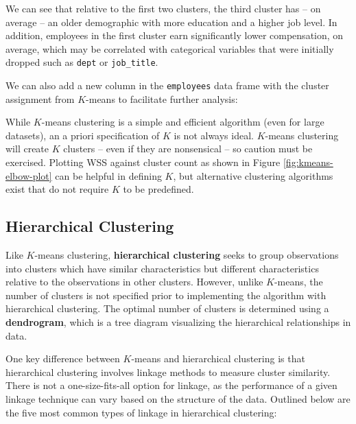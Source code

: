 \documentclass[
]{book}
\newenvironment{Shaded}{\begin{snugshade}}{\end{snugshade}}
\newcommand{\AttributeTok}[1]{\textcolor[rgb]{0.77,0.63,0.00}{#1}}
\newcommand{\CommentTok}[1]{\textcolor[rgb]{0.56,0.35,0.01}{\textit{#1}}}
\newcommand{\FunctionTok}[1]{\textcolor[rgb]{0.00,0.00,0.00}{#1}}
\newcommand{\NormalTok}[1]{#1}
\newcommand{\OtherTok}[1]{\textcolor[rgb]{0.56,0.35,0.01}{#1}}
\newcommand{\SpecialCharTok}[1]{\textcolor[rgb]{0.00,0.00,0.00}{#1}}
\begin{document}
We can see that relative to the first two clusters, the third cluster has -- on average -- an older demographic with more education and a higher job level. In addition, employees in the first cluster earn significantly lower compensation, on average, which may be correlated with categorical variables that were initially dropped such as \texttt{dept} or \texttt{job\_title}.

We can also add a new column in the \texttt{employees} data frame with the cluster assignment from \(K\)-means to facilitate further analysis:

\begin{Shaded}
\end{Shaded}

While \(K\)-means clustering is a simple and efficient algorithm (even for large datasets), an a priori specification of \(K\) is not always ideal. \(K\)-means clustering will create \(K\) clusters -- even if they are nonsensical -- so caution must be exercised. Plotting WSS against cluster count as shown in Figure \ref{fig:kmeans-elbow-plot} can be helpful in defining \(K\), but alternative clustering algorithms exist that do not require \(K\) to be predefined.

\hypertarget{hierarchical-clustering}{%
\subsection{Hierarchical Clustering}\label{hierarchical-clustering}}

Like \(K\)-means clustering, \textbf{hierarchical clustering} seeks to group observations into clusters which have similar characteristics but different characteristics relative to the observations in other clusters. However, unlike \(K\)-means, the number of clusters is not specified prior to implementing the algorithm with hierarchical clustering. The optimal number of clusters is determined using a \textbf{dendrogram}, which is a tree diagram visualizing the hierarchical relationships in data.

One key difference between \(K\)-means and hierarchical clustering is that hierarchical clustering involves linkage methods to measure cluster similarity. There is not a one-size-fits-all option for linkage, as the performance of a given linkage technique can vary based on the structure of the data. Outlined below are the five most common types of linkage in hierarchical clustering:
\end{document}

